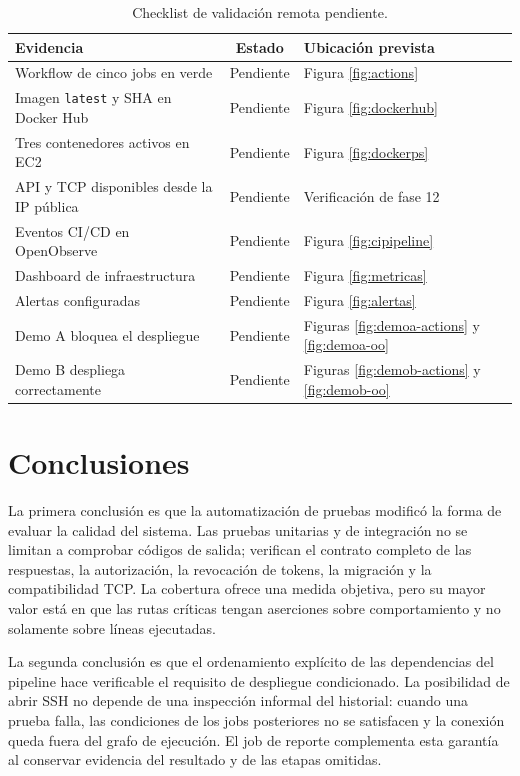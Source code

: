 \documentclass[12pt,a4paper]{article}
\begin{document}
\begin{table}[H]
  \centering
  \caption{Checklist de validación remota pendiente.}
  \small
  \begin{tabularx}{\textwidth}{p{5.4cm} c X}
    \toprule
    Evidencia & Estado & Ubicación prevista \\
    \midrule
    Workflow de cinco jobs en verde & Pendiente & Figura \ref{fig:actions} \\
    Imagen \texttt{latest} y SHA en Docker Hub & Pendiente & Figura \ref{fig:dockerhub} \\
    Tres contenedores activos en EC2 & Pendiente & Figura \ref{fig:dockerps} \\
    API y TCP disponibles desde la IP pública & Pendiente & Verificación de fase 12 \\
    Eventos CI/CD en OpenObserve & Pendiente & Figura \ref{fig:cipipeline} \\
    Dashboard de infraestructura & Pendiente & Figura \ref{fig:metricas} \\
    Alertas configuradas & Pendiente & Figura \ref{fig:alertas} \\
    Demo A bloquea el despliegue & Pendiente & Figuras \ref{fig:demoa-actions} y \ref{fig:demoa-oo} \\
    Demo B despliega correctamente & Pendiente & Figuras \ref{fig:demob-actions} y \ref{fig:demob-oo} \\
    \bottomrule
  \end{tabularx}
\end{table}

\section{Conclusiones}

La primera conclusión es que la automatización de pruebas modificó la forma de evaluar la calidad del sistema. Las pruebas unitarias y de integración no se limitan a comprobar códigos de salida; verifican el contrato completo de las respuestas, la autorización, la revocación de tokens, la migración y la compatibilidad TCP. La cobertura ofrece una medida objetiva, pero su mayor valor está en que las rutas críticas tengan aserciones sobre comportamiento y no solamente sobre líneas ejecutadas.

La segunda conclusión es que el ordenamiento explícito de las dependencias del pipeline hace verificable el requisito de despliegue condicionado. La posibilidad de abrir SSH no depende de una inspección informal del historial: cuando una prueba falla, las condiciones de los jobs posteriores no se satisfacen y la conexión queda fuera del grafo de ejecución. El job de reporte complementa esta garantía al conservar evidencia del resultado y de las etapas omitidas.
\end{document}
